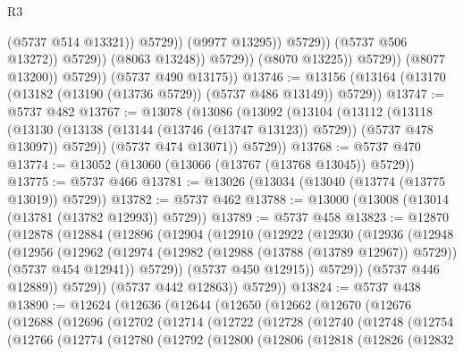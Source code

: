 \begin{lexlean}{R3}
\begin{coremodule}
                                          (@5737 @514 @13321))
                                        @5729))
                                    (@9977 @13295))
                                  @5729))
                              (@5737 @506 @13272))
                            @5729))
                        (@8063 @13248))
                      @5729))
                  (@8070 @13225))
                @5729))
            (@8077 @13200))
          @5729))
      (@5737 @490 @13175))
@13746 := @13156 (@13164 (@13170 (@13182 (@13190 (@13736 @5729)) (@5737 @486 @13149)) @5729))
@13747 := @5737 @482
@13767 := @13078
    (@13086
      (@13092
        (@13104
          (@13112
            (@13118
              (@13130 (@13138 (@13144 (@13746 (@13747 @13123)) @5729)) (@5737 @478 @13097))
              @5729))
          (@5737 @474 @13071))
        @5729))
@13768 := @5737 @470
@13774 := @13052 (@13060 (@13066 (@13767 (@13768 @13045)) @5729))
@13775 := @5737 @466
@13781 := @13026 (@13034 (@13040 (@13774 (@13775 @13019)) @5729))
@13782 := @5737 @462
@13788 := @13000 (@13008 (@13014 (@13781 (@13782 @12993)) @5729))
@13789 := @5737 @458
@13823 := @12870
    (@12878
      (@12884
        (@12896
          (@12904
            (@12910
              (@12922
                (@12930
                  (@12936
                    (@12948
                      (@12956
                        (@12962
                          (@12974
                            (@12982 (@12988 (@13788 (@13789 @12967)) @5729))
                            (@5737 @454 @12941))
                          @5729))
                      (@5737 @450 @12915))
                    @5729))
                (@5737 @446 @12889))
              @5729))
          (@5737 @442 @12863))
        @5729))
@13824 := @5737 @438
@13890 := @12624
    (@12636
      (@12644
        (@12650
          (@12662
            (@12670
              (@12676
                (@12688
                  (@12696
                    (@12702
                      (@12714
                        (@12722
                          (@12728
                            (@12740
                              (@12748
                                (@12754
                                  (@12766
                                    (@12774
                                      (@12780
                                        (@12792
                                          (@12800
                                            (@12806
                                              (@12818
                                                (@12826
                                                  (@12832

\end{coremodule}
\end{lexlean}
